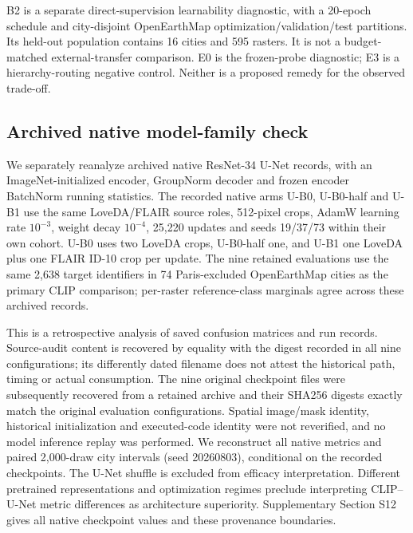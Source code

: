 B2 is a separate direct-supervision learnability diagnostic, with a 20-epoch schedule and city-disjoint OpenEarthMap optimization/validation/test partitions. Its held-out population contains 16 cities and 595 rasters. It is not a budget-matched external-transfer comparison. E0 is the frozen-probe diagnostic; E3 is a hierarchy-routing negative control. Neither is a proposed remedy for the observed trade-off.

\subsection{Archived native model-family check}
\label{sec:unet_protocol}
We separately reanalyze archived native ResNet-34 U-Net records, with an ImageNet-initialized encoder, GroupNorm decoder and frozen encoder BatchNorm running statistics. The recorded native arms U-B0, U-B0-half and U-B1 use the same LoveDA/FLAIR source roles, 512-pixel crops, AdamW learning rate $10^{-3}$, weight decay $10^{-4}$, 25,220 updates and seeds 19/37/73 within their own cohort. U-B0 uses two LoveDA crops, U-B0-half one, and U-B1 one LoveDA plus one FLAIR ID-10 crop per update. The nine retained evaluations use the same 2,638 target identifiers in 74 Paris-excluded OpenEarthMap cities as the primary CLIP comparison; per-raster reference-class marginals agree across these archived records.

This is a retrospective analysis of saved confusion matrices and run records. Source-audit content is recovered by equality with the digest recorded in all nine configurations; its differently dated filename does not attest the historical path, timing or actual consumption. The nine original checkpoint files were subsequently recovered from a retained archive and their SHA256 digests exactly match the original evaluation configurations. Spatial image/mask identity, historical initialization and executed-code identity were not reverified, and no model inference replay was performed. We reconstruct all native metrics and paired 2,000-draw city intervals (seed 20260803), conditional on the recorded checkpoints. The U-Net shuffle is excluded from efficacy interpretation. Different pretrained representations and optimization regimes preclude interpreting CLIP--U-Net metric differences as architecture superiority. Supplementary Section S12 gives all native checkpoint values and these provenance boundaries.

